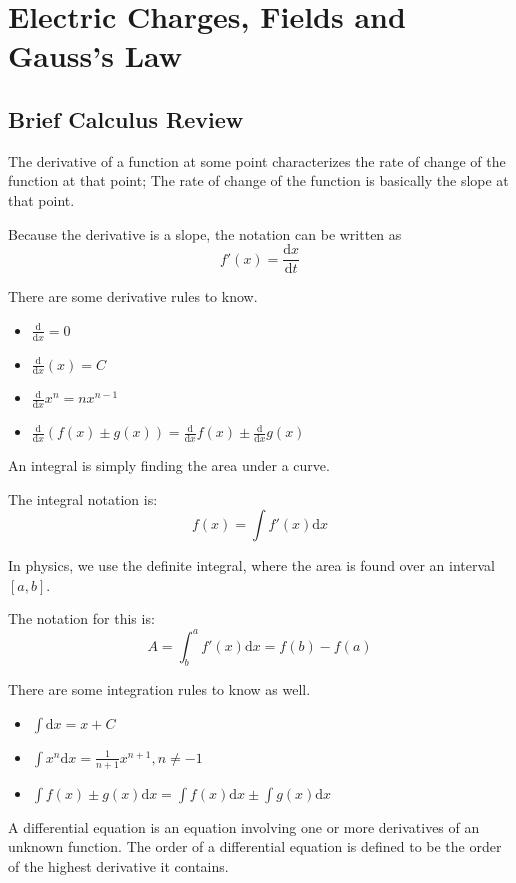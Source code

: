 \documentclass[../em.tex]{subfiles}
\begin{document}
\chapter{Electric Charges, Fields and Gauss's Law}
\section*{Brief Calculus Review}
The derivative of a function at some point characterizes the rate of change of the function at that point; 
The rate of change of the function is basically the slope at that point.

Because the derivative is a slope, the notation can be written as 
\[f'(x)=\frac{\mathrm{d}x}{\mathrm{d}t}\]

There are some derivative rules to know.
\begin{itemize}
    \item $\frac{\mathrm{d}}{\mathrm{d}x} = 0$
    \item $\frac{\mathrm{d}}{\mathrm{d}x}(x) = C$
    \item $\frac{\mathrm{d}}{\mathrm{d}x}x^n = nx^{n-1}$
    \item $\frac{\mathrm{d}}{\mathrm{d}x}(f(x)\pm g(x))=\frac{\mathrm{d}}{\mathrm{d}x}f(x)\pm \frac{\mathrm{d}}{\mathrm{d}x}g(x)$
\end{itemize}

An integral is simply finding the area under a curve. 

The integral notation is:
\[f(x)=\int{f'(x)\mathrm{d}x}\]

In physics, we use the definite integral, where the area is found over an interval $[a,b]$.

The notation for this is:
\[A = \int_b^a{f'(x)\mathrm{d}x}=f(b)-f(a)\]

There are some integration rules to know as well.
\begin{itemize}
    \item $\int{\mathrm{d}x} = x+C$
    \item $\int{x^n\mathrm{d}x}=\frac{1}{n+1}x^{n+1}, n \neq -1$
    \item $\int{f(x)\pm g(x)\mathrm{d}x}=\int{f(x)\mathrm{d}x}\pm \int{g(x)\mathrm{d}x}$
\end{itemize}

A differential equation is an equation involving one or more derivatives of an unknown function. 
The order of a differential equation is defined to be the order of the highest derivative it contains.
\end{document}
